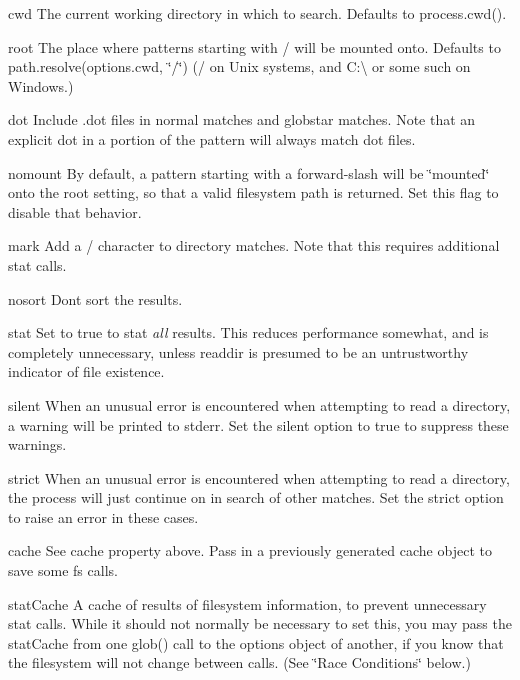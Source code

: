\begin{DoxyItemize}
\item {\ttfamily cwd} The current working directory in which to search. Defaults to {\ttfamily process.\+cwd()}.
\item {\ttfamily root} The place where patterns starting with {\ttfamily /} will be mounted onto. Defaults to {\ttfamily path.\+resolve(options.\+cwd, \char`\"{}/\char`\"{})} ({\ttfamily /} on Unix systems, and {\ttfamily C\+:\textbackslash{}} or some such on Windows.)
\item {\ttfamily dot} Include {\ttfamily .dot} files in normal matches and {\ttfamily globstar} matches. Note that an explicit dot in a portion of the pattern will always match dot files.
\item {\ttfamily nomount} By default, a pattern starting with a forward-\/slash will be \char`\"{}mounted\char`\"{} onto the root setting, so that a valid filesystem path is returned. Set this flag to disable that behavior.
\item {\ttfamily mark} Add a {\ttfamily /} character to directory matches. Note that this requires additional stat calls.
\item {\ttfamily nosort} Don\textquotesingle{}t sort the results.
\item {\ttfamily stat} Set to true to stat {\itshape all} results. This reduces performance somewhat, and is completely unnecessary, unless {\ttfamily readdir} is presumed to be an untrustworthy indicator of file existence.
\item {\ttfamily silent} When an unusual error is encountered when attempting to read a directory, a warning will be printed to stderr. Set the {\ttfamily silent} option to true to suppress these warnings.
\item {\ttfamily strict} When an unusual error is encountered when attempting to read a directory, the process will just continue on in search of other matches. Set the {\ttfamily strict} option to raise an error in these cases.
\item {\ttfamily cache} See {\ttfamily cache} property above. Pass in a previously generated cache object to save some fs calls.
\item {\ttfamily stat\+Cache} A cache of results of filesystem information, to prevent unnecessary stat calls. While it should not normally be necessary to set this, you may pass the stat\+Cache from one glob() call to the options object of another, if you know that the filesystem will not change between calls. (See \char`\"{}\+Race Conditions\char`\"{} below.)

\end{DoxyItemize}
